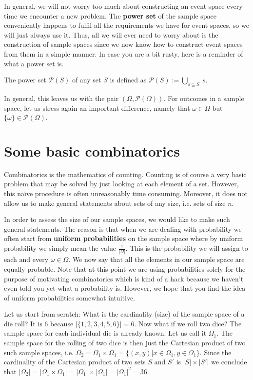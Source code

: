 \documentclass[a4paper,11pt,leqno]{report}
\begin{document}
In general, we will not worry too much about constructing an event space every time we encounter a new
problem. The \textbf{power set} of the sample space conveniently happens to fulfil all the requirements
we have for event spaces, so we will just always use it. Thus, all we will ever need to worry about
is the construction of sample spaces since we now know how to construct event spaces from them in a 
simple manner. In case you are a bit rusty, here is a reminder of what a power
set is.

\begin{Definition} 
The power set $ \mathcal{P}(S) $ of any set $ S $ is defined as $ \mathcal{P}(S) := \underset{s \subseteq S}{\bigcup}~s $.
\end{Definition}

In general, this leaves us with the pair $ (\Omega, \mathcal{P}(\Omega)) $. For outcomes in a sample space,
let us stress again an important difference, namely that $ \omega \in \Omega $ but 
$ \{\omega\} \in \mathcal{P}(\Omega)$.

\section{Some basic combinatorics}
Combinatorics is the mathematics of counting. Counting is of course a very basic problem that may
be solved by just looking at each element of a set. However, this na\"ive procedure is often
unreasonably time consuming. Moreover, it does not allow us to make general statements about sets of any 
size, i.e. sets of size $ n $.

In order to assess the size of our sample spaces, we would like to make such general statements. The reason
is that when we are dealing with probability we often start from \textbf{uniform probabilities} 
on the sample space where by uniform probability we simply mean the value $ \frac{1}{|\Omega|} $. This
is the probability we will assign to each and every $ \omega \in \Omega $. We now say that all the
elements in our sample space are equally probable. 
Note that at this point we are using probabilities solely for the purpose of motivating combinatorics which
is kind of a hack because we haven't even told you yet what a probability is. However, we hope that you
find the idea of uniform probabilities somewhat intuitive. 

Let us start from scratch: What is the cardinality (size) of the sample space of a die roll? It
is $ 6 $ because $ |\{1,2,3,4,5,6\}| = 6 $. Now what if we roll two dice? The sample space for each 
individual die is already known. Let us call it $ \Omega_{1} $. The sample space for the rolling of two dice
is then just the Cartesian product of two such sample spaces, i.e.
$ \Omega_{2} = \Omega_{1} \times \Omega_{1} = \{(x,y)|x \in \Omega_{1}, y \in \Omega_{1}\} $. Since
the cardinality of the Cartesian product of two sets $ S $ and $ S' $ is $ |S| \times |S'| $ we conclude
that $ |\Omega_{2}| = |\Omega_{1} \times \Omega_{1}| = |\Omega_{1}| \times |\Omega_{1}| 
= |\Omega_{1}|^{2} = 36 $.
\end{document}
